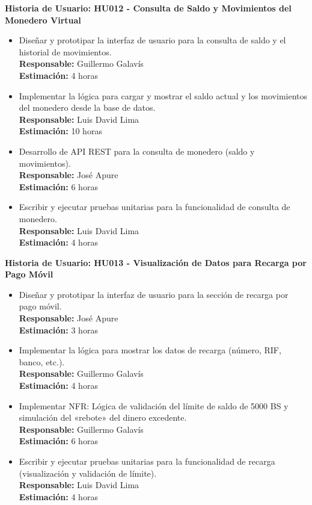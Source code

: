 \documentclass[12pt]{article}
\begin{document}
\textbf{Historia de Usuario: HU012 - Consulta de Saldo y Movimientos del Monedero Virtual}
\begin{itemize}
	\item Diseñar y prototipar la interfaz de usuario para la consulta de saldo y el historial de movimientos. \\
	\textbf{Responsable:} Guillermo Galavís \\
	\textbf{Estimación:} 4 horas
	\item Implementar la lógica para cargar y mostrar el saldo actual y los movimientos del monedero desde la base de datos. \\
	\textbf{Responsable:} Luis David Lima \\
	\textbf{Estimación:} 10 horas
	\item Desarrollo de API REST para la consulta de monedero (saldo y movimientos). \\
	\textbf{Responsable:} José Apure \\
	\textbf{Estimación:} 6 horas
	\item Escribir y ejecutar pruebas unitarias para la funcionalidad de consulta de monedero. \\
	\textbf{Responsable:} Luis David Lima \\
	\textbf{Estimación:} 4 horas
\end{itemize}

\textbf{Historia de Usuario: HU013 - Visualización de Datos para Recarga por Pago Móvil}
\begin{itemize}
	\item Diseñar y prototipar la interfaz de usuario para la sección de recarga por pago móvil. \\
	\textbf{Responsable:} José Apure \\
	\textbf{Estimación:} 3 horas
	\item Implementar la lógica para mostrar los datos de recarga (número, RIF, banco, etc.). \\
	\textbf{Responsable:} Guillermo Galavís \\
	\textbf{Estimación:} 4 horas
	\item Implementar NFR: Lógica de validación del límite de saldo de 5000 BS y simulación del «rebote» del dinero excedente. \\
	\textbf{Responsable:} Guillermo Galavís \\
	\textbf{Estimación:} 6 horas
	\item Escribir y ejecutar pruebas unitarias para la funcionalidad de recarga (visualización y validación de límite). \\
	\textbf{Responsable:} Luis David Lima \\
	\textbf{Estimación:} 4 horas
\end{itemize}
\end{document}

